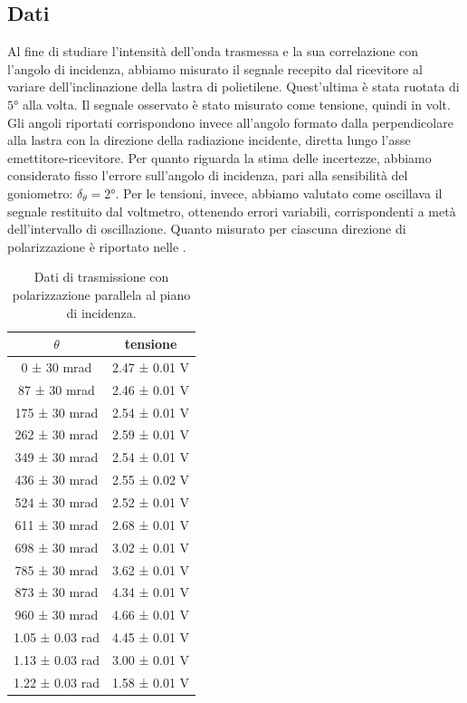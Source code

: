 \documentclass[a4paper]{article}
\begin{document}
\subsection{Dati}
Al fine di studiare l'intensità dell'onda trasmessa e la sua correlazione con l'angolo di incidenza, abbiamo misurato il segnale recepito dal ricevitore al variare dell'inclinazione della lastra di polietilene. Quest'ultima è stata ruotata di $\ang{5}$ alla volta. Il segnale osservato è stato misurato come tensione, quindi in volt. Gli angoli riportati corrispondono invece all'angolo formato dalla perpendicolare alla lastra con la direzione della radiazione incidente, diretta lungo l'asse emettitore-ricevitore. Per quanto riguarda la stima delle incertezze, abbiamo considerato fisso l'errore sull'angolo di incidenza, pari alla sensibilità del goniometro: $\delta_{\theta}=\ang{2}$. Per le tensioni, invece, abbiamo valutato come oscillava il segnale restituito dal voltmetro, ottenendo errori variabili, corrispondenti a metà dell'intervallo di oscillazione. Quanto misurato per ciascuna direzione di polarizzazione è riportato nelle .

\begin{table}[htbp]
\centering
\begin{tabular}{|c|c|}
\hline
$\theta$ & tensione \\\hline\hline
0 ± 30 mrad & 2.47 ± 0.01 V \\
87 ± 30 mrad & 2.46 ± 0.01 V \\
175 ± 30 mrad & 2.54 ± 0.01 V \\
262 ± 30 mrad & 2.59 ± 0.01 V \\
349 ± 30 mrad & 2.54 ± 0.01 V \\
436 ± 30 mrad & 2.55 ± 0.02 V \\
524 ± 30 mrad & 2.52 ± 0.01 V \\
611 ± 30 mrad & 2.68 ± 0.01 V \\
698 ± 30 mrad & 3.02 ± 0.01 V \\
785 ± 30 mrad & 3.62 ± 0.01 V \\
873 ± 30 mrad & 4.34 ± 0.01 V \\
960 ± 30 mrad & 4.66 ± 0.01 V \\
1.05 ± 0.03 rad & 4.45 ± 0.01 V \\
1.13 ± 0.03 rad & 3.00 ± 0.01 V \\
1.22 ± 0.03 rad & 1.58 ± 0.01 V \\
\hline
\end{tabular}
\caption{Dati di trasmissione con polarizzazione parallela al piano di incidenza.}
\label{tab:brewster_par}
\end{table}
\end{document}

